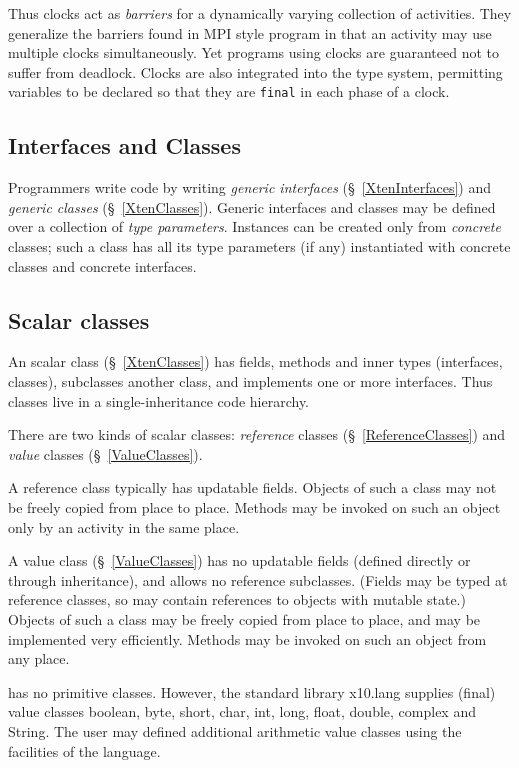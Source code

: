 Thus clocks act as {\em barriers} for a dynamically varying collection
of activities. They generalize the barriers found in MPI style program
in that an activity may use multiple clocks simultaneously. Yet
programs using clocks are guaranteed not to suffer from
deadlock. Clocks are also integrated into the \Xten{} type system,
permitting variables to be declared so that they are {\tt final} in each
phase of a clock.

\subsection{Interfaces and Classes}
Programmers write \Xten{} code by writing {\em generic interfaces}
(\S~\ref{XtenInterfaces}) and {\em generic classes}
(\S~\ref{XtenClasses}). Generic interfaces and classes may be
defined over a collection of {\em type parameters}. Instances can be
created only from {\em concrete} classes; such a class has all its
type parameters (if any) instantiated with concrete classes and
concrete interfaces.

\subsection{Scalar classes}
An \Xten{} scalar class (\S~\ref{XtenClasses}) has fields, methods and
inner types (interfaces, classes), subclasses another class, and
implements one or more interfaces. Thus \Xten{} classes live in a
single-inheritance code hierarchy.  

There are two kinds of scalar classes: {\em reference} classes
(\S~\ref{ReferenceClasses}) and {\em value} classes
(\S~\ref{ValueClasses}).

A reference class typically has updatable fields. Objects of such a
class may not be freely copied from place to place. Methods may be
invoked on such an object only by an activity in the same place.

A value class (\S~\ref{ValueClasses}) has no updatable fields (defined
directly or through inheritance), and allows no reference
subclasses. (Fields may be typed at reference classes, so may contain
references to objects with mutable state.) Objects of such a class may
be freely copied from place to place, and may be implemented very
efficiently. Methods may be invoked on such an object from any place.

\Xten{} has no primitive classes. However, the standard library {\cf
x10.lang} supplies (final) value classes {\cf boolean}, {\cf byte},
{\cf short}, {\cf char}, {\cf int}, {\cf long}, {\cf float}, {\cf
double}, {\cf complex} and {\cf String}. The user may defined
additional arithmetic value classes using the facilities of the
language.

